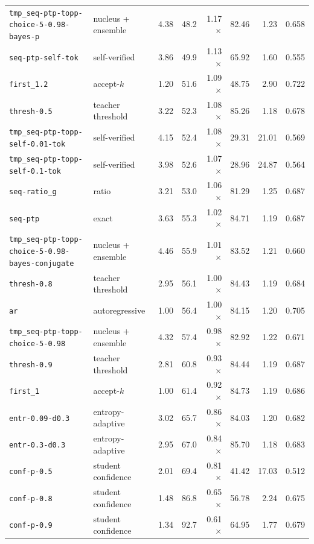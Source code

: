 {\begin{tabular}{llrrrrrr}
\texttt{tmp\_seq-ptp-topp-choice-5-0.98-bayes-p} & nucleus + ensemble & 4.38 & 48.2 & 1.17$\times$ & 82.46 & 1.23 & 0.658 \\
\texttt{seq-ptp-self-tok} & self-verified & 3.86 & 49.9 & 1.13$\times$ & 65.92 & 1.60 & 0.555 \\
\texttt{first\_1.2} & accept-$k$ & 1.20 & 51.6 & 1.09$\times$ & 48.75 & 2.90 & 0.722 \\
\texttt{thresh-0.5} & teacher threshold & 3.22 & 52.3 & 1.08$\times$ & 85.26 & 1.18 & 0.678 \\
\texttt{tmp\_seq-ptp-topp-self-0.01-tok} & self-verified & 4.15 & 52.4 & 1.08$\times$ & 29.31 & 21.01 & 0.569 \\
\texttt{tmp\_seq-ptp-topp-self-0.1-tok} & self-verified & 3.98 & 52.6 & 1.07$\times$ & 28.96 & 24.87 & 0.564 \\
\texttt{seq-ratio\_g} & ratio & 3.21 & 53.0 & 1.06$\times$ & 81.29 & 1.25 & 0.687 \\
\texttt{seq-ptp} & exact & 3.63 & 55.3 & 1.02$\times$ & 84.71 & 1.19 & 0.687 \\
\texttt{tmp\_seq-ptp-topp-choice-5-0.98-bayes-conjugate} & nucleus + ensemble & 4.46 & 55.9 & 1.01$\times$ & 83.52 & 1.21 & 0.660 \\
\texttt{thresh-0.8} & teacher threshold & 2.95 & 56.1 & 1.00$\times$ & 84.43 & 1.19 & 0.684 \\
\texttt{ar} & autoregressive & 1.00 & 56.4 & 1.00$\times$ & 84.15 & 1.20 & 0.705 \\
\texttt{tmp\_seq-ptp-topp-choice-5-0.98} & nucleus + ensemble & 4.32 & 57.4 & 0.98$\times$ & 82.92 & 1.22 & 0.671 \\
\texttt{thresh-0.9} & teacher threshold & 2.81 & 60.8 & 0.93$\times$ & 84.44 & 1.19 & 0.687 \\
\texttt{first\_1} & accept-$k$ & 1.00 & 61.4 & 0.92$\times$ & 84.73 & 1.19 & 0.686 \\
\texttt{entr-0.09-d0.3} & entropy-adaptive & 3.02 & 65.7 & 0.86$\times$ & 84.03 & 1.20 & 0.682 \\
\texttt{entr-0.3-d0.3} & entropy-adaptive & 2.95 & 67.0 & 0.84$\times$ & 85.70 & 1.18 & 0.683 \\
\texttt{conf-p-0.5} & student confidence & 2.01 & 69.4 & 0.81$\times$ & 41.42 & 17.03 & 0.512 \\
\texttt{conf-p-0.8} & student confidence & 1.48 & 86.8 & 0.65$\times$ & 56.78 & 2.24 & 0.675 \\
\texttt{conf-p-0.9} & student confidence & 1.34 & 92.7 & 0.61$\times$ & 64.95 & 1.77 & 0.679 \\

\end{tabular}}
